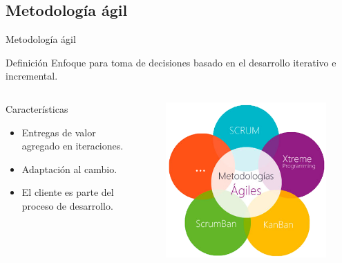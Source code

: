 \documentclass[10pt,xcolor=table ]{beamer}
\begin{document}
\subsection{Metodología ágil}
\begin{frame}{Metodología ágil}
	\begin{alertblock}{Definición}
		Enfoque para toma de decisiones basado en el desarrollo iterativo e incremental.
	\end{alertblock}

	\begin{columns}[c,onlytextwidth]
		\begin{block}{Características}
			\begin{itemize}
	        	\item Entregas de valor agregado en iteraciones.
	        	\item Adaptación al cambio.
	        	\item El cliente es parte del proceso de desarrollo.
	    	\end{itemize}
		\end{block}
		\begin{figure}
		    \includegraphics[scale=0.32]{../Figuras/met_agiles}
		\end{figure}
  	\end{columns}
\end{frame}
\end{document}
